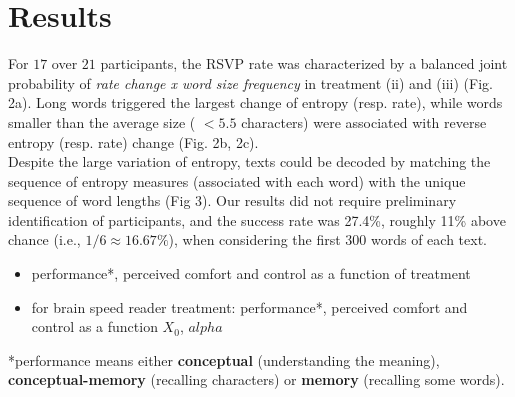 \section{Results}
\label{results}


For $17$ over $21$ participants, the RSVP rate was characterized by a balanced joint probability of {\it rate change x word size frequency} in treatment (ii) and (iii) (Fig. 2a). Long words triggered the largest change of entropy (resp. rate), while words smaller than the average size ( $< 5.5$ characters) were associated with reverse entropy (resp. rate) change (Fig. 2b, 2c).\\

Despite the large variation of entropy, texts could be decoded by matching the sequence of entropy measures (associated with each word) with the unique sequence of word lengths (Fig 3). Our results did not require preliminary identification of participants, and the success rate was 27.4\%, roughly 11\% above chance (i.e., $1/6 \approx 16.67\%$), when considering the first 300 words of each text.



\begin{itemize}
  \item performance*, perceived comfort and control as a function of treatment 
  \item for brain speed reader treatment:  performance*, perceived comfort and control as a function $X_0$, $alpha$
\end{itemize}

*performance means either {\bf conceptual} (understanding the meaning), {\bf conceptual-memory} (recalling characters) or {\bf memory} (recalling some words).

